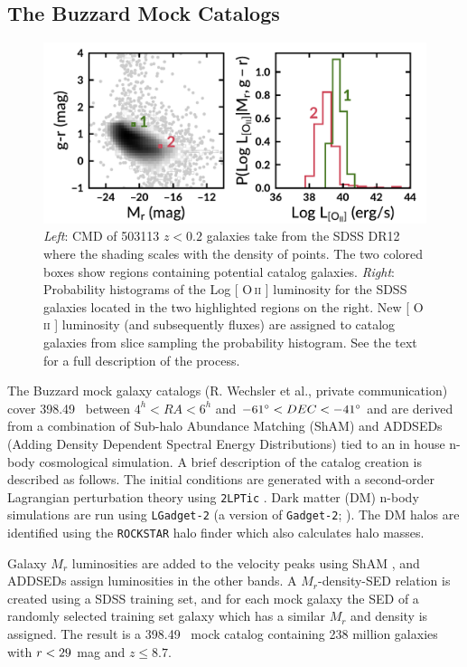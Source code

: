\documentclass[fleqn,usenatbib]{mnras}
\makeatletter
\DeclareRobustCommand{\ion}[2]{%
\relax\ifmmode
\ifx\testbx\f@series
{\mathbf{#1\,\mathsc{#2}}}\else
{\mathrm{#1\,\mathsc{#2}}}\fi
\else\textup{#1\,{\mdseries\textsc{#2}}}%
\fi}
\makeatother
\begin{document}
\subsection{The Buzzard Mock Catalogs}
\begin{figure} 
	\includegraphics[width=\textwidth]{figures/oii_sdss.pdf} 
	\caption{\textit{Left}: CMD of 503113 $z<0.2$ galaxies take from the SDSS DR12 where the shading scales with the density of points. The two colored boxes show regions containing potential catalog galaxies. \textit{Right}: Probability histograms of the Log [\ion{O}{ii}] luminosity for the SDSS galaxies located in the two highlighted regions on the right. New [\ion{O}{ii}] luminosity (and subsequently fluxes) are assigned to catalog galaxies from slice sampling the probability histogram. See the text for a full description of the process.} \label{fig: oii sdss} 
\end{figure}

The Buzzard mock galaxy catalogs (R. Wechsler et al., private communication) cover 398.49 \degsq\ between $4^h< RA < 6^h$ and $-61\hbox{$^\circ$} < DEC < -41\hbox{$^\circ$}$ and are derived from a combination of Sub-halo Abundance Matching (ShAM) and ADDSEDs (Adding Density Dependent Spectral Energy Distributions) tied to an in house n-body cosmological simulation. A brief description of the catalog creation is described as follows. The initial conditions are generated with a second-order Lagrangian perturbation theory using {\tt 2LPTic} \citep{Crocce2006}. Dark matter (DM) n-body simulations are run using {\tt LGadget-2} (a version of {\tt Gadget-2}; \citealt{Springel2005}). The DM halos are identified using the {\tt ROCKSTAR} halo finder \citep{Behroozi2013} which also calculates halo masses. 

Galaxy $M_r$ luminosities are added to the velocity peaks using ShAM \citep{Reddick2013}, and ADDSEDs assign luminosities in the other bands. A $M_r$-density-SED relation is created using a SDSS training set, and for each mock galaxy the SED of a randomly selected training set galaxy which has a similar $M_r$ and density is assigned. The result is a 398.49 \degsq\ mock catalog containing 238 million galaxies with $\hbox{$r$} < 29$ mag and $z \leq 8.7$.
\end{document}
